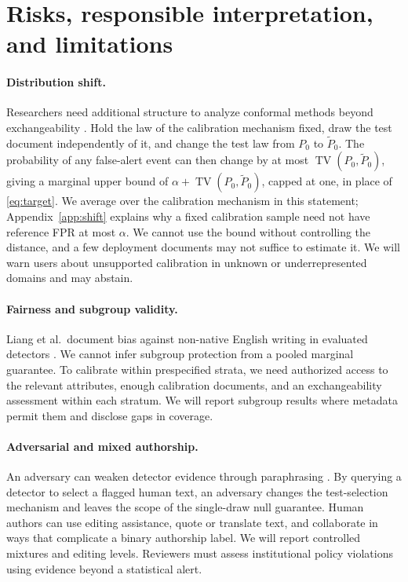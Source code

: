 \documentclass[pdflatex,sn-mathphys-num]{sn-jnl}
\newcommand{\TV}{\operatorname{TV}}
\begin{document}
\section{Risks, responsible interpretation, and limitations}\label{sec:risks}

\paragraph*{Distribution shift.}
Researchers need additional structure to analyze conformal methods beyond exchangeability \citep{barber2023}. Hold the law of the calibration mechanism fixed, draw the test document independently of it, and change the test law from \(P_0\) to \(\widetilde P_0\). The probability of any false-alert event can then change by at most \(\TV(P_0,\widetilde P_0)\), giving a marginal upper bound of \(\alpha+\TV(P_0,\widetilde P_0)\), capped at one, in place of \eqref{eq:target}. We average over the calibration mechanism in this statement; Appendix~\ref{app:shift} explains why a fixed calibration sample need not have reference FPR at most \(\alpha\). We cannot use the bound without controlling the distance, and a few deployment documents may not suffice to estimate it. We will warn users about unsupported calibration in unknown or underrepresented domains and may abstain.

\paragraph*{Fairness and subgroup validity.}
Liang et al.\ document bias against non-native English writing in evaluated detectors \citep{liang2023}. We cannot infer subgroup protection from a pooled marginal guarantee. To calibrate within prespecified strata, we need authorized access to the relevant attributes, enough calibration documents, and an exchangeability assessment within each stratum. We will report subgroup results where metadata permit them and disclose gaps in coverage.

\paragraph*{Adversarial and mixed authorship.}
An adversary can weaken detector evidence through paraphrasing \citep{sadasivan2025}. By querying a detector to select a flagged human text, an adversary changes the test-selection mechanism and leaves the scope of the single-draw null guarantee. Human authors can use editing assistance, quote or translate text, and collaborate in ways that complicate a binary authorship label. We will report controlled mixtures and editing levels. Reviewers must assess institutional policy violations using evidence beyond a statistical alert.
\end{document}
